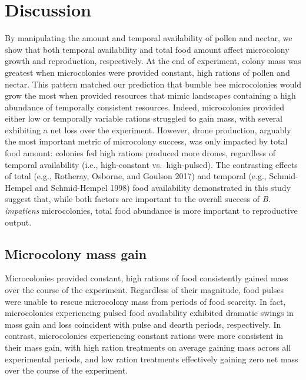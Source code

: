 \documentclass[11pt,]{article}
\begin{document}
\hypertarget{discussion}{%
\section{Discussion}\label{discussion}}

By manipulating the amount and temporal availability of pollen and
nectar, we show that both temporal availability and total food amount
affect microcolony growth and reproduction, respectively. At the end of
experiment, colony mass was greatest when microcolonies were provided
constant, high rations of pollen and nectar. This pattern matched our
prediction that bumble bee microcolonies would grow the most when
provided resources that mimic landscapes containing a high abundance of
temporally consistent resources. Indeed, microcolonies provided either
low or temporally variable rations struggled to gain mass, with several
exhibiting a net loss over the experiment. However, drone production,
arguably the most important metric of microcolony success, was only
impacted by total food amount: colonies fed high rations produced more
drones, regardless of temporal availability (i.e., high-constant
vs.~high-pulsed). The contrasting effects of total (e.g., Rotheray,
Osborne, and Goulson 2017) and temporal (e.g., Schmid-Hempel and
Schmid-Hempel 1998) food availability demonstrated in this study suggest
that, while both factors are important to the overall success of
\emph{B. impatiens} microcolonies, total food abundance is more
important to reproductive output.

\hypertarget{microcolony-mass-gain}{%
\subsection{Microcolony mass gain}\label{microcolony-mass-gain}}

Microcolonies provided constant, high rations of food consistently
gained mass over the course of the experiment. Regardless of their
magnitude, food pulses were unable to rescue microcolony mass from
periods of food scarcity. In fact, microcolonies experiencing pulsed
food availability exhibited dramatic swings in mass gain and loss
coincident with pulse and dearth periods, respectively. In contrast,
microcolonies experiencing constant rations were more consistent in
their mass gain, with high ration treatments on average gaining mass
across all experimental periods, and low ration treatments effectively
gaining zero net mass over the course of the experiment.
\end{document}
